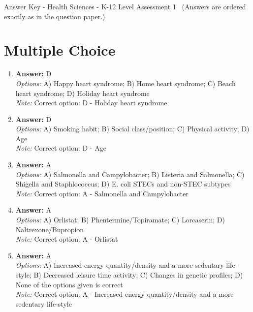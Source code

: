 \documentclass[12pt]{article}
\begin{document}
\begin{center}
Answer Key - Health Sciences - K-12 Level Assessment 1 \
\small (Answers are ordered exactly as in the question paper.)
\end{center}

\section*{Multiple Choice}
\begin{enumerate}[label=\arabic*.]
\item \textbf{Answer:} D
\\ \textit{Options:} A) Happy heart syndrome; B) Home heart syndrome; C) Beach heart syndrome; D) Holiday heart syndrome
\\ \textit{Note:} Correct option: D - Holiday heart syndrome
\item \textbf{Answer:} D
\\ \textit{Options:} A) Smoking habit; B) Social class/position; C) Physical activity; D) Age
\\ \textit{Note:} Correct option: D - Age
\item \textbf{Answer:} A
\\ \textit{Options:} A) Salmonella and Campylobacter; B) Listeria and Salmonella; C) Shigella and Staphlococcus; D) E. coli STECs and non-STEC subtypes
\\ \textit{Note:} Correct option: A - Salmonella and Campylobacter
\item \textbf{Answer:} A
\\ \textit{Options:} A) Orlistat; B) Phentermine/Topiramate; C) Lorcaserin; D) Naltrexone/Bupropion
\\ \textit{Note:} Correct option: A - Orlistat
\item \textbf{Answer:} A
\\ \textit{Options:} A) Increased energy quantity/density and a more sedentary life-style; B) Decreased leisure time activity; C) Changes in genetic profiles; D) None of the options given is correct
\\ \textit{Note:} Correct option: A - Increased energy quantity/density and a more sedentary life-style
\end{enumerate}
\end{document}
